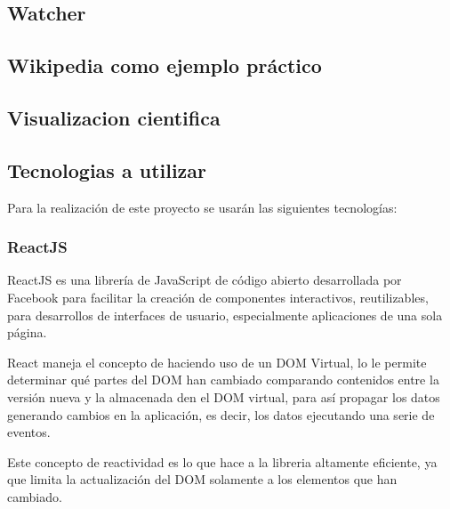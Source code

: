         
        \subsection{Watcher}


       
    \subsection{Wikipedia como ejemplo práctico}

    \subsection{Visualizacion cientifica}


\subsection{Tecnologias a utilizar}

    Para la realización de este proyecto se usarán las siguientes tecnologías:

    \subsubsection{ReactJS}

        ReactJS es una librería de JavaScript de código abierto desarrollada por Facebook para facilitar la creación de componentes interactivos, reutilizables, para desarrollos de interfaces de usuario, especialmente aplicaciones de una sola página.

        React maneja el concepto de  haciendo uso de un DOM Virtual, lo le permite determinar qué partes del DOM han cambiado comparando contenidos entre la versión nueva y la almacenada den el DOM virtual, para así propagar los datos generando cambios en la aplicación, es decir, los datos  ejecutando una serie de eventos.

        \iffalse 
            \begin{figure}
                \texttt{[image: virtual\_dom]}
                \caption{Propagación de datos usando el Virtual DOM}
            \end{figure}
        \fi

        Este concepto de reactividad es lo que hace a la libreria altamente eficiente, ya que limita la actualización del DOM solamente a los elementos que han cambiado.
        
